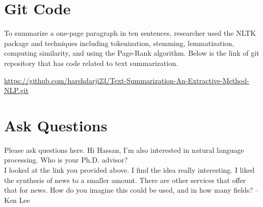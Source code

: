 \section{Git Code}
To summarize a one-page paragraph in ten sentences, researcher used the NLTK package and techniques including tokenization, stemming, lemmatization, computing similarity, and using the Page-Rank algorithm. Below is the link of git repository that has code related to text summarization.

\url{https://github.com/harshdarji23/Text-Summarization-An-Extractive-Method-NLP.git}

\section{Ask Questions}
Please ask questions here.
Hi Hassan, I'm also interested in natural language processing. Who is your Ph.D. advisor?\\
I looked at the link you provided above. I find the idea really interesting. I liked the synthesis of news to a smaller amount.  There are other services that offer that for news. How do you imagine this could be used, and in how many fields? -- Ken Lee 


